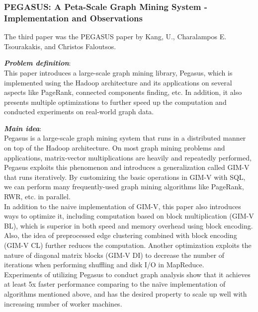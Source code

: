 \subsubsection{PEGASUS: A Peta-Scale Graph Mining System - Implementation and Observations} 
The third paper was the PEGASUS paper by Kang, U., Charalampos E. Tsourakakis, and Christos Faloutsos.\cite{kang2009pegasus}
\begin{itemize*}
\item {\em \textbf{Problem definition}}: \\
This paper introduces a large-scale graph mining library, Pegasus, which is implemented using the Hadoop architecture and its applications on several aspects like PageRank, connected components finding, etc. In addition, it also presents multiple optimizations to further speed up the computation and conducted experiments on real-world graph data.
 \\ 

\item {\em \textbf{Main idea}}: \\
Pegasus is a large-scale graph mining system that runs in a distributed manner on top of the Hadoop architecture. On most graph mining problems and applications, matrix-vector multiplications are heavily and repeatedly performed, Pegasus exploits this phenomenon and introduces a generalization called GIM-V that runs iteratively. By customizing the basic operations in GIM-V with SQL, we can perform many frequently-used graph mining algorithms like PageRank, RWR, etc. in parallel. \\
 
In addition to the naive implementation of GIM-V, this paper also introduces ways to optimize it, including computation based on block multiplication (GIM-V BL), which is superior in both speed and memory overhead using block encoding. Also, the idea of preprocessed edge clustering combined with block encoding (GIM-V CL) further reduces the computation. Another optimization exploits the nature of diagonal matrix blocks (GIM-V DI) to decrease the number of iterations when performing shuffling and disk I/O in MapReduce.\\
 
Experiments of utilizing Pegasus to conduct graph analysis show that it achieves at least 5x faster performance comparing to the naïve implementation of algorithms mentioned above, and has the desired property to scale up well with increasing number of worker machines. \\ 


\end{itemize*}

